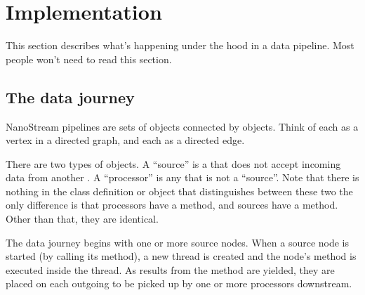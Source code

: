 \documentclass[letterpaper,10pt,english]{sphinxmanual}
\begin{document}
\chapter{Implementation}
\label{\detokenize{implementation:implementation}}\label{\detokenize{implementation::doc}}
This section describes what’s happening under the hood in a 
data pipeline. Most people won’t need to read this section.


\section{The data journey}
\label{\detokenize{implementation:the-data-journey}}
NanoStream pipelines are sets of  objects connected by 
objects. Think of each  as a vertex in a directed graph, and each
 as a directed edge.

There are two types of  objects. A “source” is a  that does not accept incoming data from another . A “processor” is any  that is not a “source”. Note that there is nothing in the class definition or object that distinguishes between these two \textendash{} the only
difference is that processors have a  method, and sources have a  method. Other than that, they are identical.

The data journey begins with one or more source nodes. When a source node is started (by calling its  method), a new thread is created and the node’s  method is executed inside the thread. As results from the  method are yielded, they are placed on each outgoing  to be picked up by one or more processors downstream.
\end{document}
